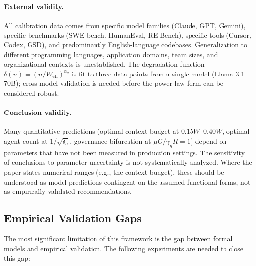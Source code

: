 \documentclass[11pt, a4paper, logo, copyright]{googledeepmind}
\begin{document}
\paragraph{External validity.} All calibration data comes from specific model families (Claude, GPT, Gemini), specific benchmarks (SWE-bench, HumanEval, RE-Bench), specific tools (Cursor, Codex, GSD), and predominantly English-language codebases. Generalization to different programming languages, application domains, team sizes, and organizational contexts is unestablished. The degradation function $\delta(n) = (n/W_{\text{eff}})^{\alpha_d}$ is fit to three data points from a single model (Llama-3.1-70B); cross-model validation is needed before the power-law form can be considered robust.

\paragraph{Conclusion validity.} Many quantitative predictions (optimal context budget at $0.15W$--$0.40W$, optimal agent count at $1/\sqrt{\delta_a}$, governance bifurcation at $\mu G / \gamma_g R = 1$) depend on parameters that have not been measured in production settings. The sensitivity of conclusions to parameter uncertainty is not systematically analyzed. Where the paper states numerical ranges (e.g., the context budget), these should be understood as model predictions contingent on the assumed functional forms, not as empirically validated recommendations.

\subsection{Empirical Validation Gaps}

The most significant limitation of this framework is the gap between formal models and empirical validation. The following experiments are needed to close this gap:
\end{document}
